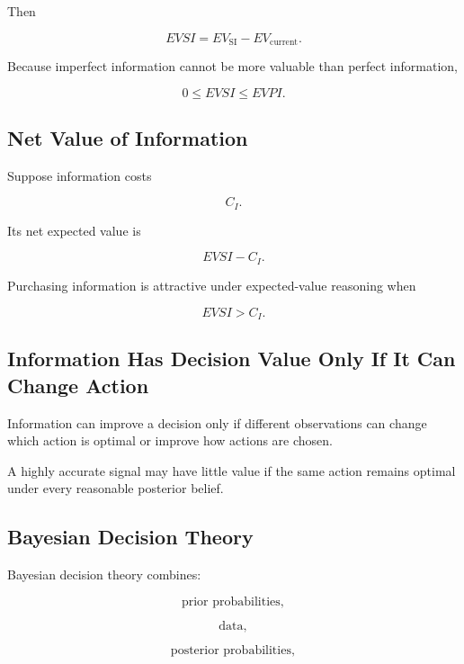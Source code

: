 Then

\[
\boxed{
EVSI
=
EV_{\mathrm{SI}}
-
EV_{\mathrm{current}}.
}
\]

Because imperfect information cannot be more valuable than perfect
information,

\[
\boxed{
0
\leq
EVSI
\leq
EVPI.
}
\]

\subsection{Net Value of Information}
\label{subsec:net-value-information}

Suppose information costs

\[
C_I.
\]

Its net expected value is

\[
\boxed{
EVSI-C_I.
}
\]

Purchasing information is attractive under expected-value reasoning when

\[
\boxed{
EVSI>C_I.
}
\]

\subsection{Information Has Decision Value Only If It Can Change Action}
\label{subsec:information-change-action}

Information can improve a decision only if different observations can
change which action is optimal or improve how actions are chosen.

A highly accurate signal may have little value if the same action remains
optimal under every reasonable posterior belief.

\subsection{Bayesian Decision Theory}
\label{subsec:bayesian-decision-theory}

Bayesian decision theory combines:

\[
\boxed{
\text{prior probabilities},
}
\]

\[
\boxed{
\text{data},
}
\]

\[
\boxed{
\text{posterior probabilities},
}
\]

